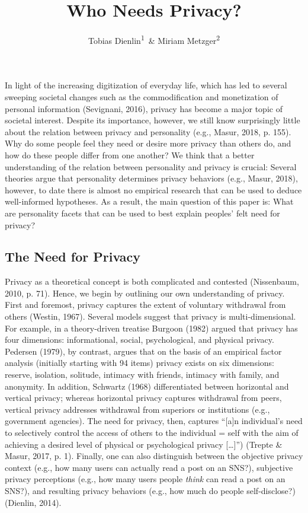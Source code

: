 \documentclass[man,floatsintext]{apa6}
\title{Who Needs Privacy?}
\author{Tobias Dienlin\textsuperscript{1}~\& Miriam Metzger\textsuperscript{2}}
\date{}
\affiliation{
\vspace{0.5cm}
\textsuperscript{1} University of Hohenheim\\\textsuperscript{2} University of California, Santa Barbara}
\begin{document}
\maketitle

In light of the increasing digitization of everyday life, which has led to several sweeping societal changes such as the commodification and monetization of personal information (Sevignani, 2016), privacy has become a major topic of societal interest. Despite its importance, however, we still know surprisingly little about the relation between privacy and personality (e.g., Masur, 2018, p. 155). Why do some people feel they need or desire more privacy than others do, and how do these people differ from one another? We think that a better understanding of the relation between personality and privacy is crucial: Several theories argue that personality determines privacy behaviors (e.g., Masur, 2018), however, to date there is almost no empirical research that can be used to deduce well-informed hypotheses. As a result, the main question of this paper is: What are personality facets that can be used to best explain peoples' felt need for privacy?

\hypertarget{the-need-for-privacy}{%
\subsection{The Need for Privacy}\label{the-need-for-privacy}}

Privacy as a theoretical concept is both complicated and contested (Nissenbaum, 2010, p. 71). Hence, we begin by outlining our own understanding of privacy. First and foremost, privacy captures the extent of voluntary withdrawal from others (Westin, 1967). Several models suggest that privacy is multi-dimensional. For example, in a theory-driven treatise Burgoon (1982) argued that privacy has four dimensions: informational, social, psychological, and physical privacy. Pedersen (1979), by contrast, argues that on the basis of an empirical factor analysis (initially starting with 94 items) privacy exists on six dimensions: reserve, isolation, solitude, intimacy with friends, intimacy with family, and anonymity. In addition, Schwartz (1968) differentiated between horizontal and vertical privacy; whereas horizontal privacy captures withdrawal from peers, vertical privacy addresses withdrawal from superiors or institutions (e.g., government agencies). The need for privacy, then, captures \enquote{{[}a{]}n individual's need to selectively control the
access of others to the individual = self with the aim of achieving a desired level of physical or psychological privacy {[}\ldots{}{]}}) (Trepte \& Masur, 2017, p. 1). Finally, one can also distinguish between the objective privacy context (e.g., how many users can actually read a post on an SNS?), subjective privacy perceptions (e.g., how many users people \emph{think} can read a post on an SNS?), and resulting privacy behaviors (e.g., how much do people self-disclose?) (Dienlin, 2014).
\end{document}
